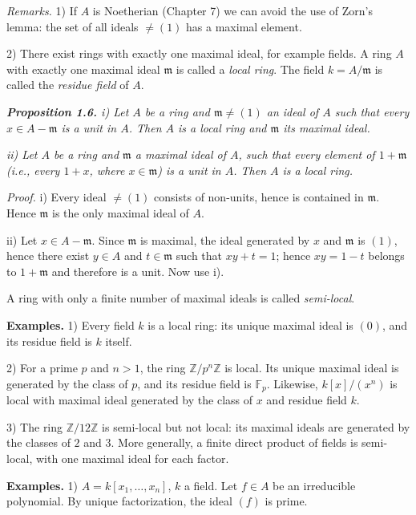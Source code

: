 \medskip
\noindent\emph{Remarks.}  1) If $A$ is Noetherian (Chapter 7) we can avoid the use of Zorn's
lemma: the set of all ideals $\ne(1)$ has a maximal element.

2) There exist rings with exactly one maximal ideal, for example fields.
A ring $A$ with exactly one maximal ideal $\mathfrak m$ is called a \emph{local ring}.  The field
$k=A/\mathfrak m$ is called the \emph{residue field} of $A$.

\medskip
\noindent\textit{\textbf{Proposition 1.6.} i) Let $A$ be a ring and $\mathfrak m\ne(1)$ an ideal of $A$ such that
every $x\in A-\mathfrak m$ is a unit in $A$. Then $A$ is a local ring and $\mathfrak m$ its maximal ideal.}

\noindent\textit{ii) Let $A$ be a ring and $\mathfrak m$ a maximal ideal of $A$, such that every element of
$1+\mathfrak m$ (i.e., every $1+x$, where $x\in\mathfrak m$) is a unit in $A$. Then $A$ is a local ring.}

\noindent\emph{Proof.}  i) Every ideal $\ne(1)$ consists of non-units, hence is contained in $\mathfrak m$.
Hence $\mathfrak m$ is the only maximal ideal of $A$.

ii) Let $x\in A-\mathfrak m$.  Since $\mathfrak m$ is maximal, the ideal generated by $x$ and $\mathfrak m$ is
$(1)$, hence there exist $y\in A$ and $t\in\mathfrak m$ such that $xy+t=1$; hence $xy=1-t$
belongs to $1+\mathfrak m$ and therefore is a unit.  Now use i).\proofbox

A ring with only a finite number of maximal ideals is called \emph{semi-local}.

\textline
\noindent\textbf{Examples.} 1) Every field $k$ is a local ring: its unique
maximal ideal is $(0)$, and its residue field is $k$ itself.

2) For a prime $p$ and $n>1$, the ring $\mathbb Z/p^n\mathbb Z$ is local.  Its
unique maximal ideal is generated by the class of $p$, and its residue field is
$\mathbb F_p$.  Likewise, $k[x]/(x^n)$ is local with maximal ideal generated by
the class of $x$ and residue field $k$.

3) The ring $\mathbb Z/12\mathbb Z$ is semi-local but not local: its maximal
ideals are generated by the classes of $2$ and $3$.  More generally, a finite
direct product of fields is semi-local, with one maximal ideal for each factor.
\textline

\medskip
\noindent\textbf{Examples.}  1) $A=k[x_1,\ldots,x_n]$, $k$ a field.  Let $f\in A$ be an irreducible polynomial.  By unique factorization, the ideal $(f)$ is prime.

